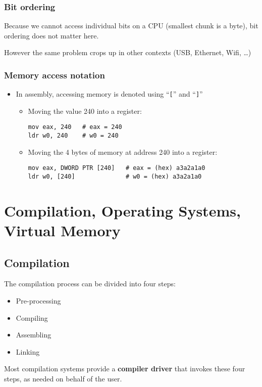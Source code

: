 \documentclass[12pt]{article}
\begin{document}
\subsubsection{Bit ordering}

Because we cannot access individual bits on a CPU (smallest chunk is a byte), 
bit ordering does not matter here.

However the same problem crops up in other contexts (USB, Ethernet, Wifi, \ldots)

\subsubsection{Memory access notation}

\begin{itemize}
\item In assembly, accessing memory is denoted using ``\texttt{[}'' and ``\texttt{]}''
\begin{itemize}
\item Moving the value 240 into a register:
\begin{lstlisting}
mov eax, 240   # eax = 240
ldr w0, 240    # w0 = 240
\end{lstlisting}

\item Moving the 4 bytes of memory at address 240 into a register:
\begin{lstlisting}
mov eax, DWORD PTR [240]   # eax = (hex) a3a2a1a0
ldr w0, [240]              # w0 = (hex) a3a2a1a0
\end{lstlisting}
\end{itemize}
\end{itemize}




















\newpage
\section{Compilation, Operating Systems, Virtual Memory}

\subsection{Compilation}
The compilation process can be divided into four steps:
\begin{itemize}
    \item Pre-processing
    \item Compiling
    \item Assembling
    \item Linking
\end{itemize}
Most compilation systems provide a \textbf{compiler driver} that invokes these four steps, as needed on behalf of the user.
\end{document}
